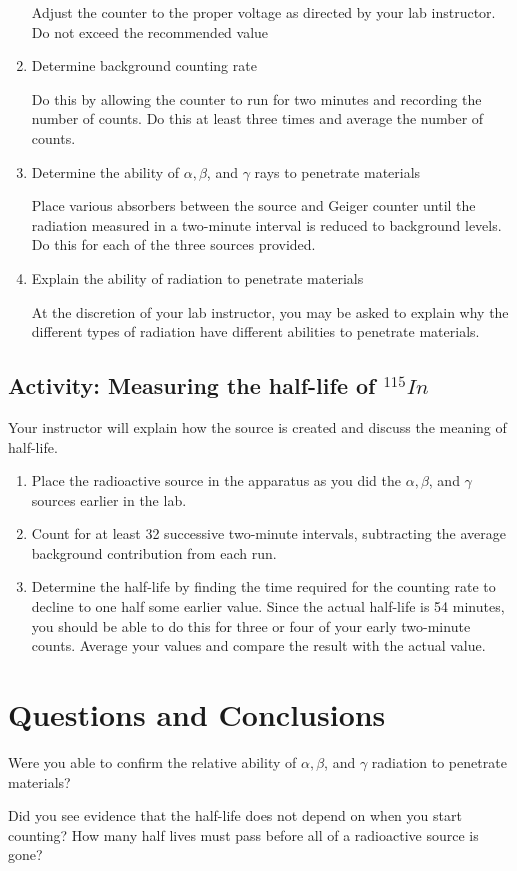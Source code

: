 \begin{multicols}{2}
\begin{enumerate}
Adjust the counter to the proper voltage as directed by your lab instructor. Do not exceed the recommended value

	\item Determine background counting rate
	
Do this by allowing the counter to run for two minutes and recording the number of counts. Do this at least three times and average the number of counts.

	\item Determine the ability of  $\alpha, \beta$, and $\gamma $ rays to penetrate materials

Place various absorbers between the source and Geiger counter until the radiation measured in a two-minute interval is reduced to background levels. Do this for each of the three sources provided.

	\item Explain the ability of radiation to penetrate materials

At the discretion of your lab instructor, you may be asked to explain why the different types of radiation have different abilities to penetrate materials.

\end{enumerate}


\subsection{Activity: Measuring the half-life of $^{115}In$}
Your instructor will explain how the source is created and discuss the meaning of half-life.
\begin{enumerate}
	\item Place the radioactive source in the apparatus as you did the $\alpha, \beta$, and $\gamma$ sources earlier in the lab.

	\item Count for at least 32 successive two-minute intervals, subtracting the average background contribution from each run.

	\item Determine the half-life by finding the time required for the counting rate to decline to one half some earlier value. Since the actual half-life is 54 minutes, you should be able to do this for three or four of your early two-minute counts. Average your values and compare the result with the actual value.
\end{enumerate}

\section {Questions and Conclusions}
Were you able to confirm the relative ability of $\alpha, \beta$, and $\gamma$ radiation to penetrate materials?

Did you see evidence that the half-life does not depend on when you start counting? How many half lives must pass before all of a radioactive source is gone? 
\end{multicols}

\endinput
